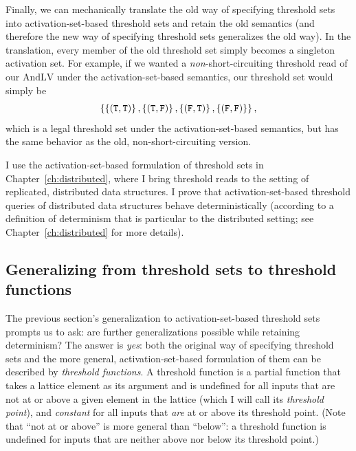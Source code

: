 Finally, we can mechanically translate the old way of specifying
threshold sets into activation-set-based threshold sets and retain the
old semantics (and therefore the new way of specifying threshold sets
generalizes the old way).  In the translation, every member of the old
threshold set simply becomes a singleton activation set.  For example,
if we wanted a \emph{non}-short-circuiting threshold read of our
$\mathrm{AndLV}$ under the activation-set-based semantics, our
threshold set would simply be
\[
\left\{
  \left\{ (\texttt{T},\texttt{T}) \right\},
  \left\{ (\texttt{T},\texttt{F}) \right\},
  \left\{ (\texttt{F},\texttt{T}) \right\},
  \left\{ (\texttt{F},\texttt{F}) \right\}
\right\},
\]
which is a legal threshold set under the activation-set-based
semantics, but has the same behavior as the old, non-short-circuiting
version.

I use the activation-set-based formulation of threshold sets in
Chapter~\ref{ch:distributed}, where I bring threshold reads to the
setting of replicated, distributed data structures.  I prove that
activation-set-based threshold queries of distributed data structures
behave deterministically (according to a definition of determinism
that is particular to the distributed setting; see
Chapter~\ref{ch:distributed} for more details).


\subsection{Generalizing from threshold sets to threshold functions}\label{subsection:lvars-generalizing-from-threshold-sets-to-threshold-functions}

The previous section's generalization to activation-set-based
threshold sets prompts us to ask: are further generalizations possible
while retaining determinism?  The answer is \emph{yes}: both the
original way of specifying threshold sets and the more general,
activation-set-based formulation of them can be described by
\emph{threshold functions}.  A threshold function is a partial
function that takes a lattice element as its argument and is undefined
for all inputs that are not at or above a given element in the lattice
(which I will call its \emph{threshold point}), and \emph{constant}
for all inputs that \emph{are} at or above its threshold point.  (Note
that ``not at or above'' is more general than ``below'': a threshold
function is undefined for inputs that are neither above nor below its
threshold point.)

